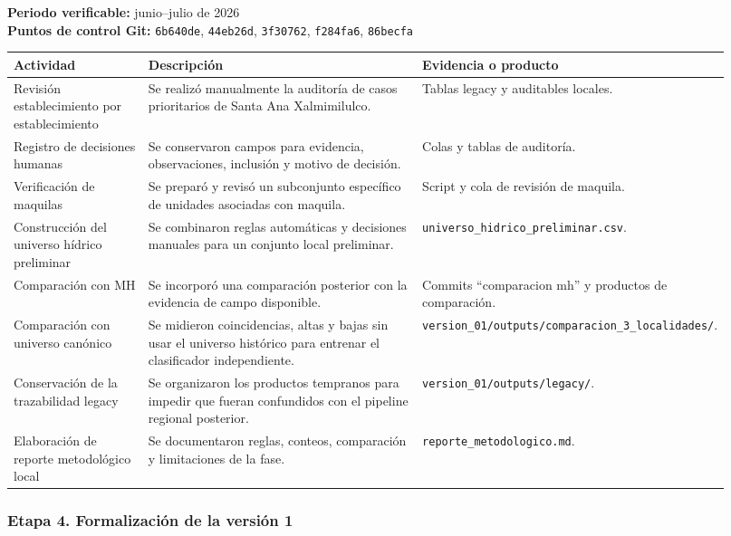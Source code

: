 \documentclass[
  spanish,
]{article}
\newcounter{none} %
\begin{document}
\textbf{Periodo verificable:} junio--julio de 2026\\
\textbf{Puntos de control Git:} \texttt{6b640de}, \texttt{44eb26d},
\texttt{3f30762}, \texttt{f284fa6}, \texttt{86becfa}

{\def\LTcaptype{none} %
\begin{longtable}[]{@{}p{0.20\linewidth}p{0.44\linewidth}p{0.28\linewidth}@{}}
\toprule\noalign{}
Actividad & Descripción & Evidencia o producto \\
\midrule\noalign{}
\endhead
\bottomrule\noalign{}
\endlastfoot
Revisión establecimiento por establecimiento & Se realizó manualmente la
auditoría de casos prioritarios de Santa Ana Xalmimilulco. & Tablas
legacy y auditables locales. \\
Registro de decisiones humanas & Se conservaron campos para evidencia,
observaciones, inclusión y motivo de decisión. & Colas y tablas de
auditoría. \\
Verificación de maquilas & Se preparó y revisó un subconjunto específico
de unidades asociadas con maquila. & Script y cola de revisión de
maquila. \\
Construcción del universo hídrico preliminar & Se combinaron reglas
automáticas y decisiones manuales para un conjunto local preliminar. &
\texttt{universo\_hidrico\_preliminar.csv}. \\
Comparación con MH & Se incorporó una comparación posterior con la
evidencia de campo disponible. & Commits ``comparacion mh'' y productos
de comparación. \\
Comparación con universo canónico & Se midieron coincidencias, altas y
bajas sin usar el universo histórico para entrenar el clasificador
independiente. &
\texttt{version\_01/outputs/comparacion\_3\_localidades/}. \\
Conservación de la trazabilidad legacy & Se organizaron los productos
tempranos para impedir que fueran confundidos con el pipeline regional
posterior. & \texttt{version\_01/outputs/legacy/}. \\
Elaboración de reporte metodológico local & Se documentaron reglas,
conteos, comparación y limitaciones de la fase. &
\texttt{reporte\_metodologico.md}. \\
\end{longtable}
}

\subsubsection{Etapa 4. Formalización de la versión
1}\label{etapa-4-formalizaciuxf3n-de-la-versiuxf3n-1}
\end{document}
